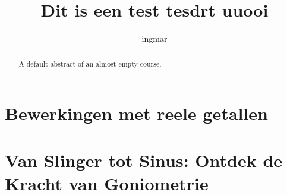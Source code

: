 \documentclass{xourse}
\title{Dit is een test tesdrt uuooi}
\author{ingmar}
\begin{document}
\begin{abstract}
    A default abstract of an almost empty course.
\end{abstract}
\maketitle

\part{Bewerkingen met reele getallen}

\part{Van Slinger tot Sinus: Ontdek de Kracht van Goniometrie}
\end{document}
